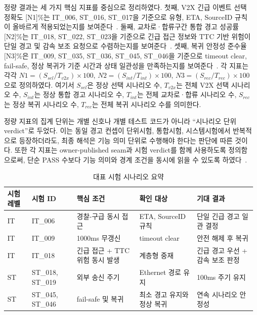 \documentclass[11pt,a4paper]{article}
\begin{document}
정량 결과는 세 가지 핵심 지표를 중심으로 정리하였다. 첫째, V2X 긴급 이벤트 선택 정확도 [N1]\%는 IT\_006, ST\_016, ST\_017을 기준으로 유형, ETA, SourceID 규칙이 올바르게 적용되었는지를 보여준다~\cite{integration_test,system_test}. 둘째, 교차로·합류구간 통합 경고 성공률 [N2]\%는 IT\_018, ST\_022, ST\_023을 기준으로 긴급 접근 정보와 TTC 기반 위험이 단일 경고 및 감속 보조 요청으로 수렴하는지를 보여준다~\cite{integration_test,system_test}. 셋째, 복귀 안정성 준수율 [N3]\%은 IT\_009, ST\_035, ST\_036, ST\_045, ST\_046을 기준으로 timeout clear, fail-safe, 정상 복귀가 기준 시간과 상태 일관성을 만족하는지를 보여준다~\cite{integration_test,master_test_matrix,system_test}. 각 지표는 각각 $N1=(S_{sel}/T_{v2x})\times100$, $N2=(S_{int}/T_{int})\times100$, $N3=(S_{rec}/T_{rec})\times100$으로 정의하였다. 여기서 $S_{sel}$은 정상 선택 시나리오 수, $T_{v2x}$는 전체 V2X 선택 시나리오 수, $S_{int}$는 정상 통합 경고 시나리오 수, $T_{int}$는 전체 교차로·합류 시나리오 수, $S_{rec}$는 정상 복귀 시나리오 수, $T_{rec}$는 전체 복귀 시나리오 수를 의미한다.

정량 지표의 집계 단위는 개별 신호나 개별 테스트 코드가 아니라 ``시나리오 단위 verdict''로 두었다. 이는 동일 경고 컨셉이 단위시험, 통합시험, 시스템시험에서 반복적으로 등장하더라도, 최종 해석은 기능 의미 단위로 수행해야 한다는 판단에 따른 것이다. 또한 각 지표는 owner-published seam과 시험 verdict를 함께 사용하도록 정의함으로써, 단순 PASS 수보다 기능 의미와 경계 조건을 동시에 읽을 수 있도록 하였다~\cite{comm_spec,master_test_matrix,system_test,sysvar_spec,suite_policy}.

\begin{table}[t]
\caption{대표 시험 시나리오 요약}
\label{tab:test_scenarios}
\centering
\footnotesize
\setlength{\tabcolsep}{4pt}
\begin{tabularx}{\linewidth}{>{\raggedright\arraybackslash}p{1.5cm} >{\raggedright\arraybackslash}p{1.8cm} >{\raggedright\arraybackslash}p{3.0cm} >{\raggedright\arraybackslash}p{2.4cm} >{\raggedright\arraybackslash}X}
\toprule
시험 레벨 & 시험 ID & 핵심 조건 & 확인 대상 & 기대 결과 \\
\midrule
IT & IT\_006 & 경찰-구급 동시 접근 & ETA, SourceID 규칙 & 단일 긴급 경고 일관 결정 \\
IT & IT\_009 & 1000ms 무갱신 & timeout clear & 안전 해제 후 복귀 \\
IT & IT\_018 & 긴급 접근 + TTC 위험 동시 발생 & 계층형 중재 & 긴급 경고 우선 + 감속 보조 판정 \\
ST & ST\_018, ST\_019 & 외부 송신 주기 & Ethernet 경로 유지 & 100ms 주기 유지 \\
ST & ST\_045, ST\_046 & fail-safe 및 복귀 & 최소 경고 유지와 정상 복귀 & 연속 시나리오 안정성 \\
\bottomrule
\end{tabularx}
\end{table}
\end{document}
